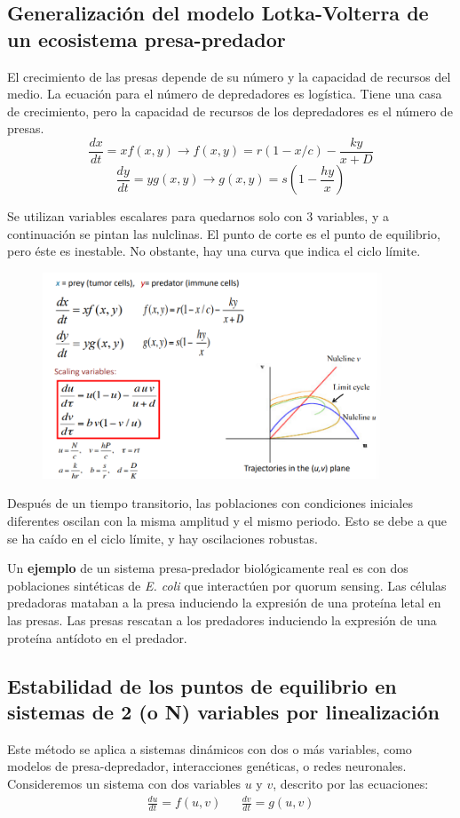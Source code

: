 \subsection{Generalización del modelo Lotka-Volterra de un ecosistema presa-predador}
El crecimiento de las presas depende de su número y la capacidad de recursos del medio. La ecuación para el número de depredadores es logística. Tiene una casa de crecimiento, pero la capacidad de recursos de los depredadores es el número de presas. 
$$\frac{dx}{dt} = xf(x,y) \rightarrow f(x,y) = r(1 - x/c) - \frac{ky}{x + D}$$
$$\frac{dy}{dt} = yg(x,y) \rightarrow g(x,y) = s(1 - \frac{hy}{x})$$

Se utilizan variables escalares para quedarnos solo con 3 variables, y a continuación se pintan las nulclinas. El punto de corte es el punto de equilibrio, pero éste es inestable. No obstante, hay una curva que indica el ciclo límite. 

\begin{figure}[h]
\centering
\includegraphics[width = 0.9\textwidth]{figs/ciclo-limite-lv.png}
\end{figure}

Después de un tiempo transitorio, las poblaciones con condiciones iniciales diferentes oscilan con la misma amplitud y el mismo periodo. Esto se debe a que se ha caído en el ciclo límite, y hay oscilaciones robustas. 

Un \textbf{ejemplo} de un sistema presa-predador biológicamente real es con dos poblaciones sintéticas de \textit{E. coli} que interactúen por quorum sensing. Las células predadoras mataban a la presa induciendo la expresión de una proteína letal en las presas. Las presas rescatan a los predadores induciendo la expresión de una proteína antídoto en el predador. 

\subsection{Estabilidad de los puntos de equilibrio en sistemas de 2 (o N) variables por linealización}
Este método se aplica a sistemas dinámicos con dos o más variables, como modelos de presa-depredador, interacciones genéticas, o redes neuronales. Consideremos un sistema con dos variables $u$ y $v$, descrito por las ecuaciones:
\begin{align*}
\frac{du}{dt} = f(u, v) && \frac{dv}{dt} = g(u, v)
\end{align*}

